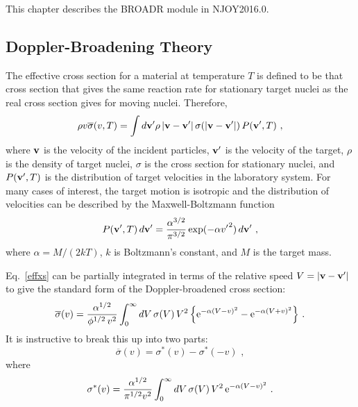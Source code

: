 This chapter describes the BROADR module in NJOY2016.0.

\subsection{Doppler-Broadening Theory}
\label{ssBROADR_theory}

The effective cross section for a material at temperature $T$ is
defined to be that cross section that gives the same reaction rate
for stationary target nuclei as the real cross section gives for
moving nuclei.  Therefore,
\begin{equation}
  \rho v {\overline \sigma}(v,T)=
    \int d{\bf v}' \rho\,|{\bf v}-{\bf v}'|\,\sigma(|{\bf v}-{\bf v}'|
    )\,P({\bf v}',T)\,\,,
\label{effxs}
\end{equation}
where ${\bf v}$ is the velocity of the incident particles,
${\bf v}'$ is the velocity of the target, $\rho$ is the density
of target nuclei, $\sigma$ is the cross section for stationary
nuclei, and $P({\bf v}',T)$ is the distribution of target
velocities in the laboratory system.  For many cases of interest,
the target motion is isotropic and the distribution of velocities
can be described by the Maxwell-Boltzmann
function
\begin{equation}
  P({\bf v}',T)\,d{\bf v}'=
    {{\alpha^{3/2}} \over {\pi^{3/2}}} \exp (-\alpha {v'}^2)\,
    d{\bf v}'\,\,,
\end{equation}
where $\alpha=M/(2kT)$, $k$ is Boltzmann's constant, and $M$ is the target mass.

Eq.~\ref{effxs} can be partially integrated in terms of the
relative speed $V=|{\bf v}-{\bf v}'|$ to give the standard form
of the Doppler-broadened cross section:
\begin{equation}
  {\overline\sigma}(v)={{\alpha^{1/2}} \over {\phi^{1/2}\,v^2}}
    \int_0^\infty dV\,\sigma(V)\,V^2\,\Bigl\lbrace
    {\rm e}^{-\alpha (V-v)^2}-{\rm e}^{-\alpha (V+v)^2}
    \Bigr\rbrace \,\,.
\label{standform}
\end{equation}
It is instructive to break this up into two parts:
\begin{equation}
  {\overline\sigma}(v)=\sigma^* (v)-\sigma^*(-v)\,\,,
\end{equation}
where
\begin{equation}
  \sigma^*(v)={{\alpha^{1/2}} \over {\pi^{1/2}v^2}}
    \int_0^\infty dV\,\sigma(V)\,V^2\,{\rm e}
    ^{-\alpha (V-v)^2} \,\,.
\label{sigv}
\end{equation}


